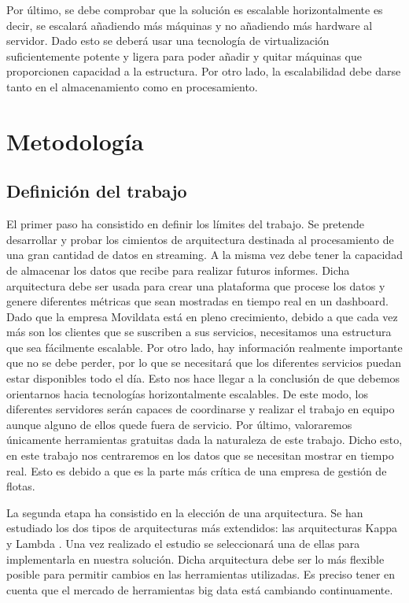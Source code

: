 Por último, se debe comprobar que la solución es escalable
horizontalmente es decir, se escalará añadiendo más máquinas y no
añadiendo más hardware al servidor. Dado esto se deberá usar una
tecnología de virtualización suficientemente potente y ligera para
poder añadir y quitar máquinas que proporcionen capacidad a la
estructura. Por otro lado, la escalabilidad debe darse tanto en el
almacenamiento como en procesamiento.



\section{Metodología\label{metodologia}}

\subsection{Definición del trabajo\label{etapasTrab}}

El primer paso ha consistido en definir los límites del trabajo. Se
pretende desarrollar y probar los cimientos de arquitectura destinada
al procesamiento de una gran cantidad de datos en streaming. A la
misma vez debe tener la capacidad de almacenar los datos que recibe
para realizar futuros informes. Dicha arquitectura debe ser usada para
crear una plataforma que procese los datos y genere diferentes
métricas que sean mostradas en tiempo real en un dashboard. Dado que
la empresa Movildata está en pleno crecimiento, debido a que cada vez
más son los clientes que se suscriben a sus servicios, necesitamos una
estructura que sea fácilmente escalable. Por otro lado, hay
información realmente importante que no se debe perder, por lo que se
necesitará que los diferentes servicios puedan estar disponibles todo
el día. Esto nos hace llegar a la conclusión de que debemos
orientarnos hacia tecnologías horizontalmente escalables. De este
modo, los diferentes servidores serán capaces de coordinarse y
realizar el trabajo en equipo aunque alguno de ellos quede fuera de
servicio. Por último, valoraremos únicamente herramientas gratuitas
dada la naturaleza de este trabajo. Dicho esto, en este trabajo nos
centraremos en los datos que se necesitan mostrar en tiempo real. Esto
es debido a que es la parte más crítica de una empresa de gestión de
flotas.

La segunda etapa ha consistido en la elección de una arquitectura. Se
han estudiado los dos tipos de arquitecturas más extendidos: las
arquitecturas Kappa y Lambda \cite{LambdaKappa2}. Una vez realizado el
estudio se seleccionará una de ellas para implementarla en nuestra
solución. Dicha arquitectura debe ser lo más flexible posible para
permitir cambios en las herramientas utilizadas. Es preciso tener en
cuenta que el mercado de herramientas big data está cambiando
continuamente.

